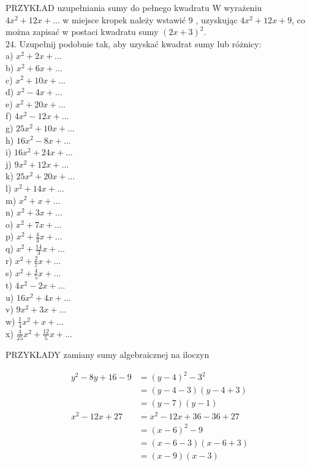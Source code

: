 \documentclass[10pt]{article}
\begin{document}
PRZYKŁAD uzupełniania sumy do pełnego kwadratu W wyrażeniu \(4 x^{2}+12 x+\ldots\) w miejsce kropek należy wstawić 9 , uzyskując \(4 x^{2}+12 x+9\), co można zapisać w postaci kwadratu sumy \((2 x+3)^{2}\).\\
24. Uzupełnij podobnie tak, aby uzyskać kwadrat sumy lub różnicy:\\
a) \(x^{2}+2 x+\ldots\)\\
b) \(x^{2}+6 x+\ldots\)\\
c) \(x^{2}+10 x+\ldots\)\\
d) \(x^{2}-4 x+\ldots\)\\
e) \(x^{2}+20 x+\ldots\)\\
f) \(4 x^{2}-12 x+\ldots\)\\
g) \(25 x^{2}+10 x+\ldots\)\\
h) \(16 x^{2}-8 x+\ldots\)\\
i) \(16 x^{2}+24 x+\ldots\)\\
j) \(9 x^{2}+12 x+\ldots\)\\
k) \(25 x^{2}+20 x+\ldots\)\\
l) \(x^{2}+14 x+\ldots\)\\
m) \(x^{2}+x+\ldots\)\\
n) \(x^{2}+3 x+\ldots\)\\
o) \(x^{2}+7 x+\ldots\)\\
p) \(x^{2}+\frac{4}{3} x+\ldots\)\\
q) \(x^{2}+\frac{14}{3} x+\ldots\)\\
r) \(x^{2}+\frac{2}{7} x+\ldots\)\\
s) \(x^{2}+\frac{4}{5} x+\ldots\)\\
t) \(4 x^{2}-2 x+\ldots\)\\
u) \(16 x^{2}+4 x+\ldots\)\\
v) \(9 x^{2}+3 x+\ldots\)\\
w) \(\frac{1}{4} x^{2}+x+\ldots\)\\
x) \(\frac{4}{25} x^{2}+\frac{12}{5} x+\ldots\)

PRZYKŁADY zamiany sumy algebraicznej na iloczyn

\[
\begin{aligned}
y^{2}-8 y+16-9 & =(y-4)^{2}-3^{2} \\
& =(y-4-3)(y-4+3) \\
& =(y-7)(y-1) \\
x^{2}-12 x+27 & =x^{2}-12 x+36-36+27 \\
& =(x-6)^{2}-9 \\
& =(x-6-3)(x-6+3) \\
& =(x-9)(x-3)
\end{aligned}
\]
\end{document}
